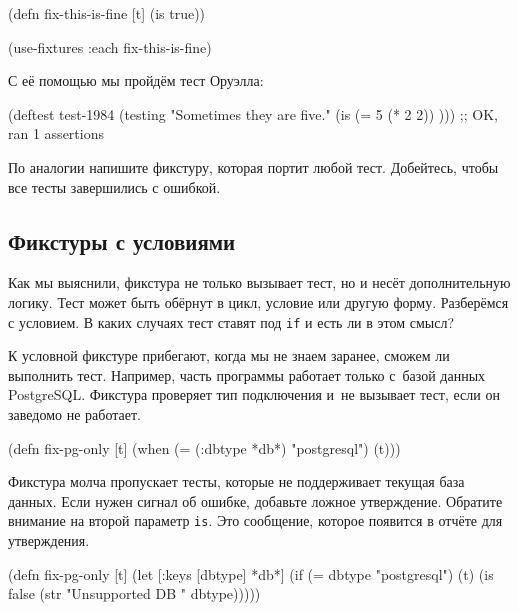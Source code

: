 \begin{english}
  \begin{clojure}
(defn fix-this-is-fine [t]
  (is true))

(use-fixtures :each fix-this-is-fine)
  \end{clojure}
\end{english}


С её помощью мы пройдём тест Оруэлла:

\begin{english}
  \begin{clojure}
(deftest test-1984
  (testing "Sometimes they are five."
    (is (= 5 (* 2 2)) )))
;; OK, ran 1 assertions
  \end{clojure}
\end{english}

По аналогии напишите фикстуру, которая портит любой тест. Добейтесь, чтобы все
тесты завершились с ошибкой.

\subsection{Фикстуры с условиями}


Как мы выяснили, фикстура не только вызывает тест, но и несёт дополнительную
логику. Тест может быть обёрнут в цикл, условие или другую форму. Разберёмся с
условием. В каких случаях тест ставят под \verb|if| и есть ли в этом смысл?

К условной фикстуре прибегают, когда мы не знаем заранее, сможем ли выполнить
тест. Например, часть программы работает только с~базой данных
PostgreSQL. Фикстура проверяет тип подключения и~не вызывает тест, если он
заведомо не работает.

\begin{english}
  \begin{clojure}
(defn fix-pg-only [t]
  (when (= (:dbtype *db*) "postgresql")
    (t)))
  \end{clojure}
\end{english}

Фикстура молча пропускает тесты, которые не поддерживает текущая база
данных. Если нужен сигнал об ошибке, добавьте ложное утверждение. Обратите
внимание на второй параметр \verb|is|. Это сообщение, которое появится в отчёте
для утверждения.

\ifnarrow

\begin{english}
  \begin{clojure}
(defn fix-pg-only [t]
  (let [{:keys [dbtype]} *db*]
    (if (= dbtype "postgresql")
      (t)
      (is false
        (str "Unsupported DB "
          dbtype)))))
  \end{clojure}
\end{english}

